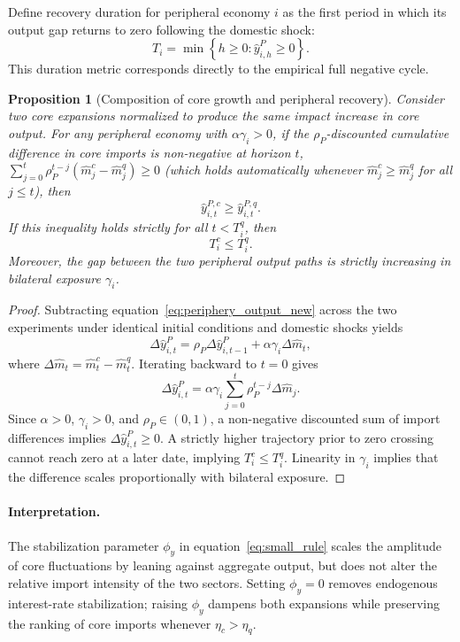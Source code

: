 \documentclass[12pt, a4paper]{article}
\newtheorem{proposition}{Proposition}
\begin{document}
Define recovery duration for peripheral economy $i$ as the first period in which its output gap returns to zero following the domestic shock:
\begin{equation}
    T_i
    = \min\left\{h\geq0:\hat y_{i,h}^{P}\geq0\right\}.
    \label{eq:recovery_time}
\end{equation}
This duration metric corresponds directly to the empirical full negative cycle.

\begin{proposition}[Composition of core growth and peripheral recovery]
\label{prop:composition_recovery}
Consider two core expansions normalized to produce the same impact increase in core output. For any peripheral economy with $\alpha\gamma_i>0$, if the $\rho_P$-discounted cumulative difference in core imports is non-negative at horizon $t$, $\sum_{j=0}^{t}\rho_P^{t-j}(\hat m_j^{c}-\hat m_j^{q})\geq 0$ (which holds automatically whenever $\hat m_j^{c}\geq \hat m_j^{q}$ for all $j\leq t$), then
\[
    \hat y_{i,t}^{P,c} \geq \hat y_{i,t}^{P,q}.
\]
If this inequality holds strictly for all $t < T_i^{q}$, then
\[
    T_i^{c} \leq T_i^{q}.
\]
Moreover, the gap between the two peripheral output paths is strictly increasing in bilateral exposure $\gamma_i$.
\end{proposition}

\begin{proof}
Subtracting equation~\eqref{eq:periphery_output_new} across the two experiments under identical initial conditions and domestic shocks yields
\[
    \Delta \hat y_{i,t}^{P}
    = \rho_P \Delta \hat y_{i,t-1}^{P}
    + \alpha\gamma_i\Delta \hat m_t,
\]
where $\Delta \hat m_t=\hat m_t^{c}-\hat m_t^{q}$. Iterating backward to $t=0$ gives
\[
    \Delta \hat y_{i,t}^{P}
    = \alpha\gamma_i
      \sum_{j=0}^{t}\rho_P^{t-j}\Delta \hat m_j.
\]
Since $\alpha>0$, $\gamma_i>0$, and $\rho_P\in(0,1)$, a non-negative discounted sum of import differences implies $\Delta \hat y_{i,t}^{P} \geq 0$. A strictly higher trajectory prior to zero crossing cannot reach zero at a later date, implying $T_i^c \leq T_i^q$. Linearity in $\gamma_i$ implies that the difference scales proportionally with bilateral exposure.
\end{proof}

\paragraph{Interpretation.}
The stabilization parameter $\phi_y$ in equation~\eqref{eq:small_rule} scales the amplitude of core fluctuations by leaning against aggregate output, but does not alter the relative import intensity of the two sectors. Setting $\phi_y=0$ removes endogenous interest-rate stabilization; raising $\phi_y$ dampens both expansions while preserving the ranking of core imports whenever $\eta_c > \eta_q$.
\end{document}
